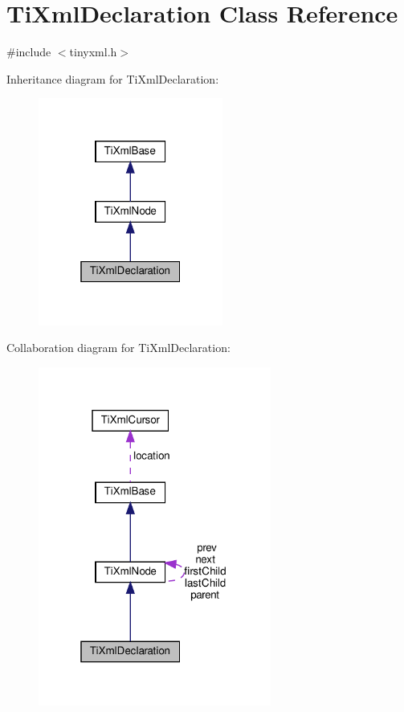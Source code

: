 \hypertarget{classTiXmlDeclaration}{}\section{Ti\+Xml\+Declaration Class Reference}
\label{classTiXmlDeclaration}


{\ttfamily \#include $<$tinyxml.\+h$>$}



Inheritance diagram for Ti\+Xml\+Declaration\+:
\nopagebreak
\begin{figure}[H]
\begin{center}
\leavevmode
\includegraphics[width=172pt]{classTiXmlDeclaration__inherit__graph}
\end{center}
\end{figure}


Collaboration diagram for Ti\+Xml\+Declaration\+:
\nopagebreak
\begin{figure}[H]
\begin{center}
\leavevmode
\includegraphics[width=217pt]{classTiXmlDeclaration__coll__graph}
\end{center}
\end{figure}
